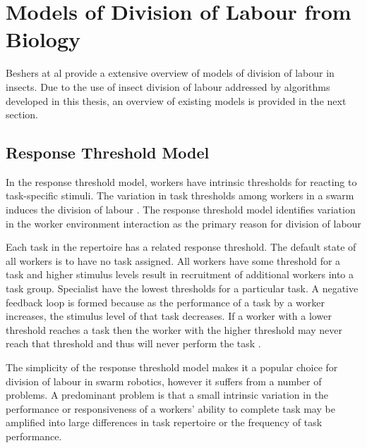 
\section{Models of Division of Labour from Biology}

Beshers at al \cite{beshers2001models} provide a extensive overview of models of division of labour in insects. Due to the use of insect division of labour addressed by algorithms developed in this thesis, an overview of existing models is provided in the next section.

\subsection{Response Threshold Model}

In the response threshold model, workers have intrinsic thresholds for reacting to task-specific stimuli. The variation in task thresholds among workers in a swarm induces the division of labour \cite{robinson1992regulation}. The response threshold model identifies variation in the worker environment interaction as the primary reason for division of labour

Each task in the repertoire has a related response threshold. The default state of all workers is to have no task assigned. All workers have some threshold for a task and higher stimulus levels result in recruitment of additional workers into a task group. Specialist have the lowest thresholds for a particular task. A negative feedback loop is formed because as the performance of a task by a worker increases, the stimulus level of that task decreases. If a worker with a lower threshold reaches a task then the worker with the higher threshold may never reach that threshold and thus will never perform the task \cite{beshers2001models}.

The simplicity of the response threshold model makes it a popular choice for division of labour in swarm robotics, however it suffers from a number of problems. A predominant problem is that a small intrinsic variation in the performance or responsiveness of a workers' ability to complete task may be amplified into large differences in task repertoire or the frequency of task performance. 

